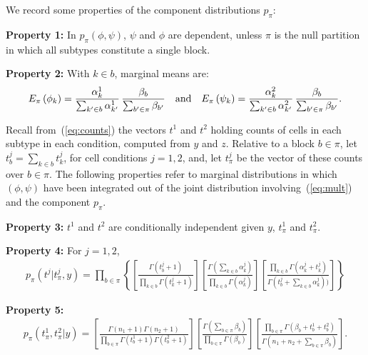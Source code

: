 \documentclass[aoas,preprint]{imsart}
\begin{document}
We record some properties of the component distributions $p_\pi$:

\noindent
{\bf Property 1:}  In $p_\pi(\phi,\psi)$, $\psi$ and $\phi$ are dependent, unless $\pi$ is the null 
partition in which all subtypes constitute a single block.


\noindent
{\bf Property 2:} With $k \in b$, marginal means are:
\begin{eqnarray*}
E_\pi\left( \phi_k \right ) = \frac{ \alpha^1_k }{ \sum_{k' \in b} \alpha^1_{k'} } \,
		\frac{ \beta_b }{ \sum_{b' \in \pi} \beta_{b'} } \quad {\mbox {\rm and}} \quad
E_\pi\left( \psi_k \right ) = \frac{ \alpha^2_k }{ \sum_{k' \in b} \alpha^2_{k'} }  \,
		\frac{ \beta_b }{ \sum_{b' \in \pi} \beta_{b'} } .
\end{eqnarray*}

Recall from~(\ref{eq:counts}) the vectors $t^1$ and $t^2$ holding
counts  of cells in each subtype in each condition, computed from $y$ and $z$.  Relative to a block $b \in \pi$, 
let $t^j_b = \sum_{k\in b} t^j_k$, for cell conditions $j=1,2$, and,
let $t^j_\pi$ be the vector of these counts over $b \in \pi$.   The following properties refer to
marginal distributions in which $(\phi,\psi)$ have been integrated out of the joint
distribution involving~(\ref{eq:mult}) and the component $p_\pi$.

\noindent
{\bf Property 3:}  $t^1$ and $t^2$ are conditionally independent given $y$, $t^1_\pi$ and $t^2_\pi$.

\noindent
{\bf Property 4:}  For $j=1,2$,
\begin{eqnarray*}
p_\pi(t^j | t^j_{\pi},y) = \prod_{b \in \pi} \left\{
\left[ \frac{ \Gamma(t^j_b +1 ) }{\prod_{k \in b} \Gamma( t^j_k + 1 ) } 
\right]
\left[ \frac{\Gamma( \sum_{k \in b} \alpha_k^j )}{
		\prod_{k\in b} \Gamma( \alpha_k^j ) } \right] 
       \left[        \frac{ \prod_{k \in b} \Gamma(\alpha_k^j + t^j_k)  }{
		\Gamma(t^j_b + \sum_{k\in b} \alpha_k^j ) )}\right]
 \right\}
\end{eqnarray*}

\noindent
{\bf Property 5:}  
\begin{eqnarray*}
p_\pi(t^1_{\pi},t^2_{\pi}| y) =
 \left[ \frac{ \Gamma(n_1+1) \Gamma(n_2+1) }{ \prod_{b \in \pi} \Gamma(t^1_b+1) 
   \Gamma( t^2_b + 1 )} \right] 
\left[ \frac{\Gamma( \sum_{b \in \pi} \beta_b  )}{
   \prod_{b \in \pi} \Gamma(\beta_b )} \right] 
 \left[ \frac{ \prod_{b \in \pi} \Gamma( \beta_b + t^1_b + t^2_b )}{
	\Gamma( n_1 + n_2 + \sum_{b \in \pi} \beta_b  )} \right].
\end{eqnarray*}
\end{document}
